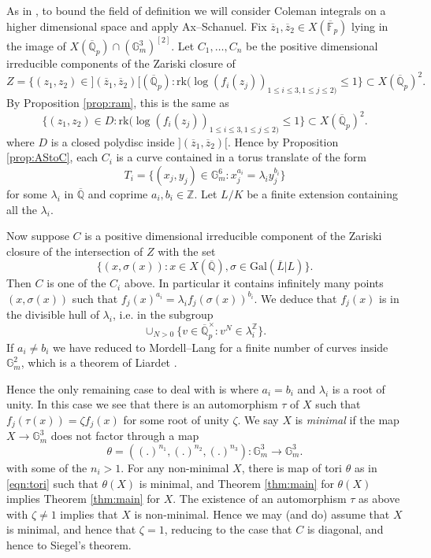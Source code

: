 \documentclass{amsart}
\def\Z{\mathbb Z}
\def\Q{\mathbb Q}
\newcommand{\rk}{\mathrm{rk}}
\theoremstyle{definition}
\newcommand{\Gal}{\mathrm{Gal}}
\newcommand{\F}{\mathbb{F}}
\begin{document}
As in \cite{DP}, to bound the field of definition we will consider Coleman integrals on a higher dimensional space and apply Ax--Schanuel. Fix $\overline{z}_1 ,\overline{z}_2 \in X(\overline{\F }_p )$ lying in the image of $X(\overline{\Q }_p )\cap (\mathbb{G}_m ^3 )^{[2]}$. 
Let $C_1 ,\ldots ,C_n $ be the positive dimensional irreducible components of the Zariski closure of 
\[
Z=\{ (z_1 ,z_2 )\in ](\overline{z}_1 ,\overline{z}_2 )[(\overline{\Q}_p ): \rk (\log (f_i (z_j ))_{1\leq i\leq 3,1\leq j\leq 2)} \leq 1\}\subset X(\overline{\Q }_p )^2 .
\]
By Proposition \ref{prop:ram}, this is the same as 
\[
\{ (z_1 ,z_2 )\in D: \rk (\log (f_i (z_j ))_{1\leq i\leq 3,1\leq j\leq 2)} \leq 1\}\subset X(\overline{\Q }_p )^2 .
\]
where $D$ is a closed polydisc inside $](\overline{z}_1 ,\overline{z}_2 )[$. Hence by Proposition \ref{prop:AStoC}, each $C_i $ is a curve contained in a torus translate of the form
\begin{equation}\label{eqn:Ti}
T_i =\{ (x_j ,y_j )\in \mathbb{G}_m ^6 : x_j ^{a_i} =\lambda _{i} y_j ^{b_i} \}
\end{equation}
for some $\lambda _{i} $ in $\overline{\Q }$ and coprime $a_i ,b_i \in \Z$. Let $L/K $ be a finite extension containing all the $\lambda _{i}$.

Now suppose $C$ is a positive dimensional irreducible component of the Zariski closure of the intersection of $Z$ with the set 
\[
\{ (x,\sigma (x)):x\in X(\overline{\Q }),\sigma \in \Gal (\overline{L}|L) \}.
\]
Then $C$ is one of the $C_i$ above. In particular it contains infinitely many points $(x,\sigma (x))$ such that $f_j (x)^{a_i }=\lambda _i f_j (\sigma (x))^{b_i }$. We deduce that $f_j (x)$ is in the divisible hull of $\lambda _i$, i.e. in the subgroup
\[
\cup _{N>0}\{ v\in \overline{\Q }_p ^\times :v^N \in \lambda _i ^{\Z } \}.
\]
If $a_i \neq b_i$ we have reduced to Mordell--Lang for a finite number of curves inside $\mathbb{G}_m ^2 $, which is a theorem of Liardet \cite{liardet}.

Hence the only remaining case to deal with is where $a_i =b_i $ and $\lambda _i $ is a root of unity. In this case we see that there is an automorphism $\tau $ of $X$ such that $f_j (\tau (x))=\zeta f_j (x)$ for some root of unity $\zeta $. We say $X$ is \textit{minimal} if the map $X\to \mathbb{G}_m ^3 $ does not factor through a map
\begin{equation}\label{eqn:tori}
\theta =((.)^{n_1 },(.)^{n_2 },(.)^{n_3 }):\mathbb{G}_m ^3 \to \mathbb{G}_m ^3 .
\end{equation}
with some of the $n_i >1$. For any non-minimal $X$, there is map of tori $\theta $ as in \eqref{eqn:tori} such that $\theta (X)$ is minimal, and Theorem \ref{thm:main} for $\theta (X)$ implies Theorem \ref{thm:main} for $X$. The existence of an automorphism $\tau $ as above with $\zeta \neq 1 $ implies that $X$ is non-minimal. Hence we may (and do) assume that $X$ is minimal, and hence that $\zeta  =1$, reducing to the case that $C$ is diagonal, and hence to Siegel's theorem.



\end{document}
